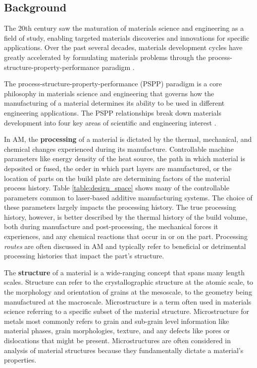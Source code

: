 \subsection{Background}
The 20th century saw the maturation of materials science and engineering as a field of study, enabling targeted materials discoveries and innovations for specific applications. Over the past several decades, materials development cycles have greatly accelerated by formulating materials problems through the process-structure-property-performance paradigm \cite{Olson2000, Panchal2013}. 

The process-structure-property-performance (PSPP) paradigm is a core philosophy in materials science and engineering that governs how the manufacturing of a material determines its ability to be used in different engineering applications. The PSPP relationships break down materials development into four key areas of scientific and engineering interest \cite{Olson2000}.

In AM, the \textbf{processing} of a material is dictated by the thermal, mechanical, and chemical changes experienced during its manufacture. Controllable machine parameters like energy density of the heat source, the path in which material is deposited or fused, the order in which part layers are manufactured, or the location of parts on the build plate are determining factors of the material process history. Table \ref{table:design_space} shows many of the controllable parameters common to laser-based additive manufacturing systems. The choice of these parameters largely impacts the processing history. The true processing history, however, is better described by the thermal history of the build volume, both during manufacture and post-processing, the mechanical forces it experiences, and any chemical reactions that occur in or on the part. Processing \textit{routes} are often discussed in AM and typically refer to beneficial or detrimental processing histories that impact the part's structure.

The \textbf{structure} of a material is a wide-ranging concept that spans many length scales. Structure can refer to the crystallographic structure at the atomic scale, to the morphology and orientation of grains at the mesoscale, to the geometry being manufactured at the macroscale. Microstructure is a term often used in materials science referring to a specific subset of the material structure. Microstructure for metals most commonly refers to grain and sub-grain level information like material phases, grain morphologies, texture, and any defects like pores or dislocations that might be present. Microstructures are often considered in analysis of material structures because they fundamentally dictate a material's properties. 

